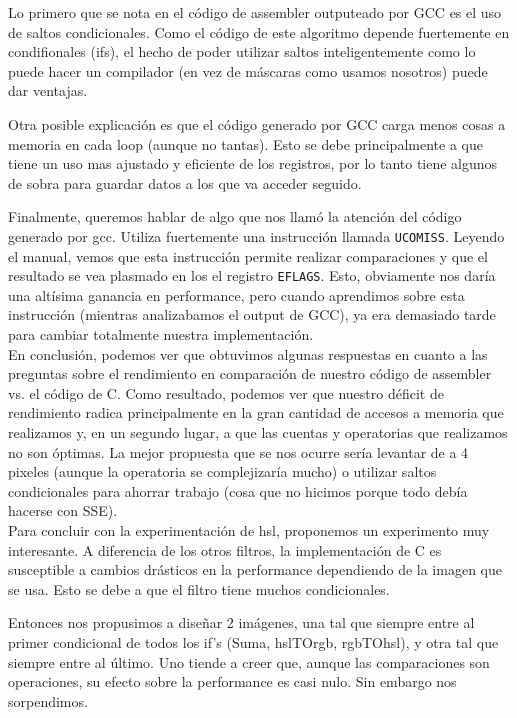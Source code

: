 Lo primero que se nota en el código de assembler outputeado por GCC es el uso de saltos condicionales. Como el código de este algoritmo depende fuertemente en condifionales (ifs), el hecho de poder utilizar saltos inteligentemente como lo puede hacer un compilador (en vez de máscaras como usamos nosotros) puede dar ventajas.

Otra posible explicación es que el código generado por GCC carga menos cosas a memoria en cada loop (aunque no tantas). Esto se debe principalmente a que tiene un uso mas ajustado y eficiente de los registros, por lo tanto tiene algunos de sobra para guardar datos a los que va acceder seguido.

Finalmente, queremos hablar de algo que nos llamó la atención del código generado por gcc. Utiliza fuertemente una instrucción llamada \texttt{UCOMISS}. Leyendo el manual, vemos que esta instrucción permite realizar comparaciones y que el resultado se vea plasmado en los el registro \texttt{EFLAGS}. Esto, obviamente nos daría una altísima ganancia en performance, pero cuando aprendimos sobre esta instrucción (mientras analizabamos el output de GCC), ya era demasiado tarde para cambiar totalmente nuestra implementación.
\\

En conclusión, podemos ver que obtuvimos algunas respuestas en cuanto a las preguntas sobre el rendimiento en comparación de nuestro código de assembler vs. el código de C. Como resultado, podemos ver que nuestro déficit de rendimiento radica principalmente en la gran cantidad de accesos a memoria que realizamos y, en un segundo lugar, a que las cuentas y operatorias que realizamos no son óptimas.
La mejor propuesta que se nos ocurre sería levantar de a 4 pixeles (aunque la operatoria se complejizaría mucho) o utilizar saltos condicionales para ahorrar trabajo (cosa que no hicimos porque todo debía hacerse con SSE).
\\

Para concluir con la experimentación de hsl, proponemos un experimento muy interesante. A diferencia de los otros filtros, la implementación de C es susceptible a cambios drásticos en la performance dependiendo de la imagen que se usa. Esto se debe a que el filtro tiene muchos condicionales.

Entonces nos propusimos a diseñar 2 imágenes, una tal que siempre entre al primer condicional de todos los if's (Suma, hslTOrgb, rgbTOhsl), y otra tal que siempre entre al último. Uno tiende a creer que, aunque las comparaciones son operaciones, su efecto sobre la performance es casi nulo. Sin embargo nos sorpendimos.


